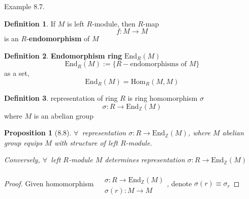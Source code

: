 \documentclass[twoside,landscape]{amsart}
\theoremstyle{plain}
\newtheorem{proposition}{Proposition}
\theoremstyle{definition}
\newtheorem{definition}{Definition}
\theoremstyle{remark}
\begin{document}
\begin{multicols*}{2}
Example 8.7.  
\begin{definition}
If $M$ is left $R$-module, then $R$-map
\begin{equation}
f:M \to M
\end{equation}
is an $R$-\textbf{endomorphism} of $M$
\end{definition}

\begin{definition}
\textbf{Endomorphism ring} $\text{End}_R(M)$ 
\begin{equation}
	\text{End}_R(M):= \lbrace R-\text{endomorphisms of $M$} \rbrace
\end{equation}
as a set, 
\begin{equation}
\text{End}_R(M) = \text{Hom}_R(M,M)
\end{equation}
\end{definition}

\begin{definition}
	representation of ring $R$ is ring homomorphism $\sigma$
\begin{equation}
	\sigma: R \to \text{End}_{\mathbb{Z}}(M)
\end{equation}	
where $M$ is an abelian group
\end{definition}

\begin{proposition}[8.8]
$\forall \, $ representation $\sigma:R \to \text{End}_{\mathbb{Z}}(M)$, where $M$ abelian group equips $M$ with structure of left $R$-module.  

Conversely, $\forall \,$ left $R$-module $M$ determines representation $\sigma:R \to \text{End}_{\mathbb{Z}}(M)$
\end{proposition}

\begin{proof}
	Given homomorphism $\begin{aligned} & \quad \\ 
	& \sigma: R\to \text{End}_{\mathbb{Z}}(M) \\
	& \sigma(r):M \to M \end{aligned}$, denote $\sigma(r) \equiv \sigma_r$


\end{proof}
\end{multicols*}
\end{document}
